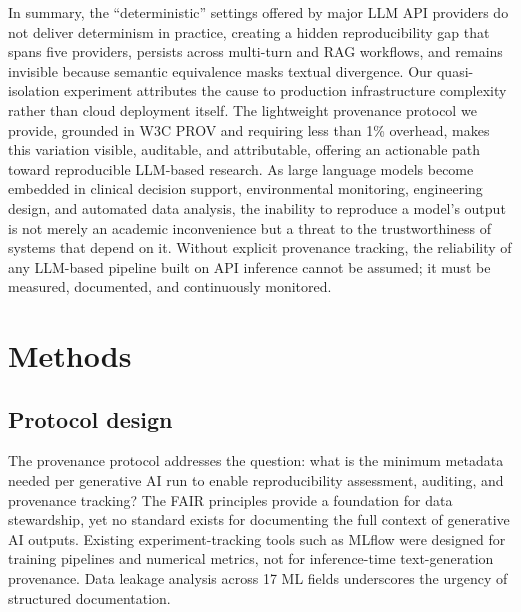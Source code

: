 \documentclass[sn-nature]{sn-jnl}
\begin{document}
In summary, the ``deterministic'' settings offered by major LLM API providers do not deliver determinism in practice, creating a hidden reproducibility gap that spans five providers, persists across multi-turn and RAG workflows, and remains invisible because semantic equivalence masks textual divergence.
Our quasi-isolation experiment attributes the cause to production infrastructure complexity rather than cloud deployment itself.
The lightweight provenance protocol we provide, grounded in W3C PROV and requiring less than 1\% overhead, makes this variation visible, auditable, and attributable, offering an actionable path toward reproducible LLM-based research.
As large language models become embedded in clinical decision support, environmental monitoring, engineering design, and automated data analysis, the inability to reproduce a model's output is not merely an academic inconvenience but a threat to the trustworthiness of systems that depend on it.
Without explicit provenance tracking, the reliability of any LLM-based pipeline built on API inference cannot be assumed; it must be measured, documented, and continuously monitored.


\section{Methods}\label{sec:methods}

\subsection{Protocol design}\label{subsec:protocol}

The provenance protocol addresses the question: what is the minimum metadata needed per generative AI run to enable reproducibility assessment, auditing, and provenance tracking?
The FAIR principles\cite{wilkinson2016fair} provide a foundation for data stewardship, yet no standard exists for documenting the full context of generative AI outputs.
Existing experiment-tracking tools such as MLflow\cite{zaharia2018accelerating} were designed for training pipelines and numerical metrics, not for inference-time text-generation provenance.
Data leakage analysis across 17 ML fields\cite{kapoor2023leakage} underscores the urgency of structured documentation.
\end{document}
